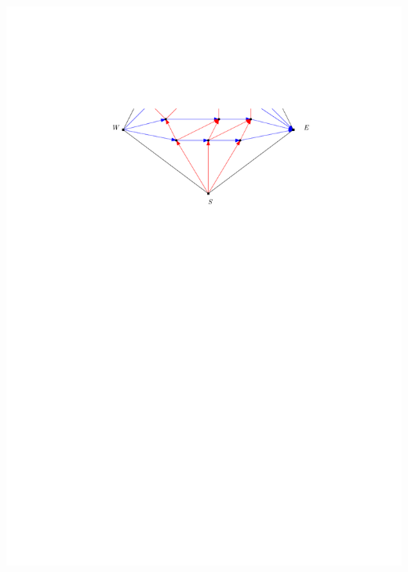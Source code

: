 \documentclass[a4paper]{article}
\begin{document}
\includegraphics[width =\textwidth]{./unifiedAlgo/img/sweep/terminateAfter.pdf}
\clearpage%
\end{document}
